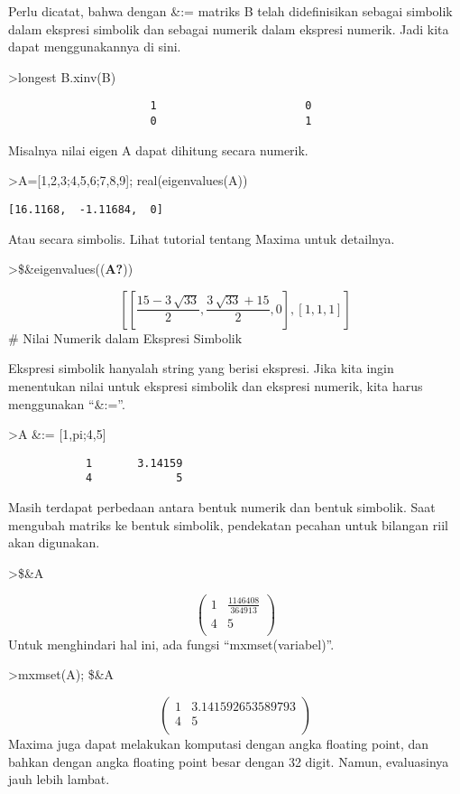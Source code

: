 \documentclass[
]{book}
\begin{document}
Perlu dicatat, bahwa dengan \&:= matriks B telah didefinisikan sebagai simbolik dalam ekspresi simbolik dan sebagai numerik dalam ekspresi numerik. Jadi kita dapat menggunakannya di sini.

\textgreater longest B.xinv(B)

\begin{verbatim}
                      1                       0 
                      0                       1 
\end{verbatim}

Misalnya nilai eigen A dapat dihitung secara numerik.

\textgreater A={[}1,2,3;4,5,6;7,8,9{]}; real(eigenvalues(A))

\begin{verbatim}
[16.1168,  -1.11684,  0]
\end{verbatim}

Atau secara simbolis. Lihat tutorial tentang Maxima untuk detailnya.

\textgreater\$\&eigenvalues((\textbf{A?}))

\[\left[ \left[ \frac{15-3\,\sqrt{33}}{2} , \frac{3\,\sqrt{33}+15}{2}, 0 \right]  , \left[ 1 , 1 , 1 \right]  \right]\]\# Nilai Numerik dalam Ekspresi Simbolik

Ekspresi simbolik hanyalah string yang berisi ekspresi. Jika kita ingin menentukan nilai untuk ekspresi simbolik dan ekspresi numerik, kita harus menggunakan ``\&:=''.

\textgreater A \&:= {[}1,pi;4,5{]}

\begin{verbatim}
            1       3.14159 
            4             5 
\end{verbatim}

Masih terdapat perbedaan antara bentuk numerik dan bentuk simbolik. Saat mengubah matriks ke bentuk simbolik, pendekatan pecahan untuk bilangan riil akan digunakan.

\textgreater\$\&A

\[\begin{pmatrix}1 & \frac{1146408}{364913} \\ 4 & 5 \\ \end{pmatrix}\]Untuk menghindari hal ini, ada fungsi ``mxmset(variabel)''.

\textgreater mxmset(A); \$\&A

\[\begin{pmatrix}1 & 3.141592653589793 \\ 4 & 5 \\ \end{pmatrix}\]Maxima juga dapat melakukan komputasi dengan angka floating point, dan bahkan dengan angka floating point besar dengan 32 digit. Namun, evaluasinya jauh lebih lambat.
\end{document}
